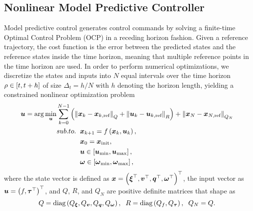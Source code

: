 \subsection{Nonlinear Model Predictive Controller}
Model predictive control generates control commands by solving a finite-time Optimal Control Problem (OCP)
in a receding horizon fashion. Given a reference trajectory, the cost function is the error between the predicted states
and the reference states inside the time horizon, meaning that multiple reference points in the time horizon are used.
In order to perform numerical optimizations, we discretize the states and inputs into $N$ equal intervals over
the time horizon $\rho \in \left[ t, t+h\right]$ of size $\Delta_t = h/N$ with $h$ denoting the horizon length,
yielding a constrained nonlinear optimization problem
\begin{equation*}
    \begin{split}
        \boldsymbol{u} = \arg \min_{\boldsymbol{u}} & \sum_{k=0}^{N-1} \left( \left \lVert {\boldsymbol{x}_k - \boldsymbol{x}_{k, \text{ref}}} \right \rVert_{Q} + 
                                                         \left \lVert {\boldsymbol{u}_k - \boldsymbol{u}_{k, \text{ref}}} \right \rVert_{R}\right) +
                                                         \left \lVert {\boldsymbol{x}_N - \boldsymbol{x}_{N, \text{ref}}} \right \rVert_{Q_N}\\
        & 
        \begin{split}
        sub. to. \hspace{0.2cm} & \boldsymbol{x}_{k+1} = f \left( \boldsymbol{x}_k, \boldsymbol{u}_k \right), \\
        & \boldsymbol{x}_0 = \boldsymbol{x}_{\text{init}}, \\
        & \boldsymbol{u} \in \left[ \boldsymbol{u}_{\text{min}}, \boldsymbol{u}_{\text{max}} \right], \\ 
        & \boldsymbol{\omega} \in \left[ \boldsymbol{\omega}_{\text{min}}, \boldsymbol{\omega}_{\text{max}} \right],
        \end{split}
    \end{split}
\end{equation*}
where the state vector is defined as $\boldsymbol{x} = \left( \boldsymbol{\xi}^{\top}, \boldsymbol{v}^{\top}, \boldsymbol{q}^{\top}, \boldsymbol{\omega}^{\top} \right)^{\top}$, the input
vector as $\boldsymbol{u} = \left( f, \boldsymbol{\tau}^{\top} \right)^{\top}$, and $Q$, $R$, and $Q_N$ are positive definite matrices that shape as
\begin{equation*}
    Q = \text{diag} \left( Q_{\boldsymbol{\xi}}, Q_{\boldsymbol{v}}, Q_{\boldsymbol{q}}, Q_{\boldsymbol{\omega}} \right), \hspace{0.2cm}
    R = \text{diag} \left( Q_{f}, Q_{\boldsymbol{\tau}} \right), \hspace{0.2cm}
    Q_N = Q.
\end{equation*}
